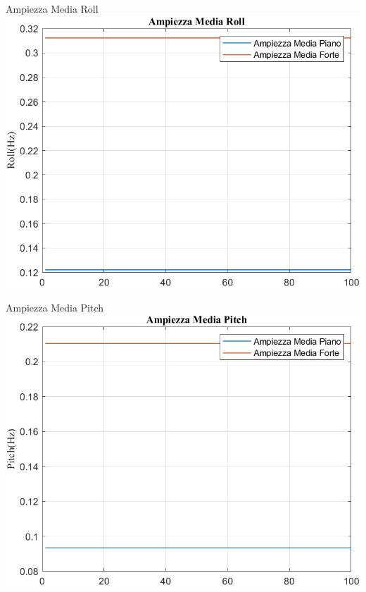 	\begin{frame}{{Ampiezza Media Roll}}					
		\centering\includegraphics[height=.8\textheight]{figure/VAng/Trasformata/Ampiezza MediaRoll}
	\end{frame}
	
	\begin{frame}{{Ampiezza Media Pitch}}					
		\centering\includegraphics[height=.8\textheight]{figure/VAng/Trasformata/Ampiezza MediaPitch}
	\end{frame}
	
